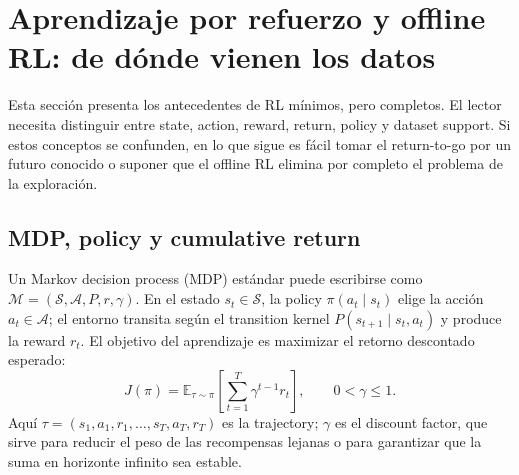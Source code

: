 \section{Aprendizaje por refuerzo y offline RL: de dónde vienen los datos}

Esta sección presenta los antecedentes de RL mínimos, pero completos. El lector necesita distinguir entre state, action, reward, return, policy y dataset support. Si estos conceptos se confunden, en lo que sigue es fácil tomar el return-to-go por un futuro conocido o suponer que el offline RL elimina por completo el problema de la exploración.

\subsection{MDP, policy y cumulative return}

Un Markov decision process (MDP) estándar puede escribirse como $\mathcal{M}=(\mathcal{S},\mathcal{A},P,r,\gamma)$. En el estado $s_t\in\mathcal{S}$, la policy $\pi(a_t\mid s_t)$ elige la acción $a_t\in\mathcal{A}$; el entorno transita según el transition kernel $P(s_{t+1}\mid s_t,a_t)$ y produce la reward $r_t$. El objetivo del aprendizaje es maximizar el retorno descontado esperado:
\[
J(\pi)=\mathbb{E}_{\tau\sim\pi}\left[\sum_{t=1}^{T}\gamma^{t-1}r_t\right],
\qquad 0<\gamma\le 1.
\]
Aquí $\tau=(s_1,a_1,r_1,\ldots,s_T,a_T,r_T)$ es la trajectory; $\gamma$ es el discount factor, que sirve para reducir el peso de las recompensas lejanas o para garantizar que la suma en horizonte infinito sea estable.


